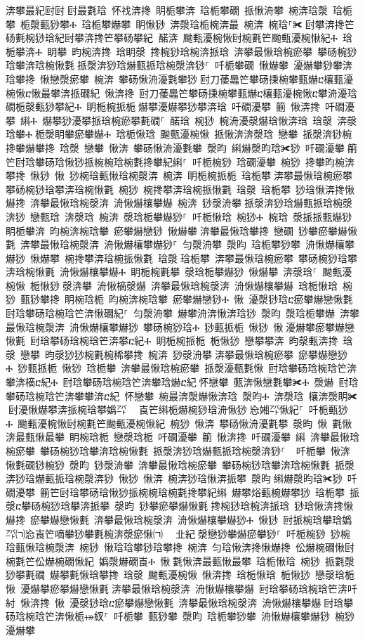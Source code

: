 ﻿\documentclass[output=paper]{langsci/langscibook}
\begin{document}
\begin{exe}
{\begin{exe}
渀攀最紀尀尀਀尀最氀琀 怀䄀渀搀 眀栀攀渀 琀栀攀礀 挀愀洀攀 椀渀琀漀 琀栀攀 栀漀甀猀攀Ⰰ 琀栀攀爀攀 眀愀猀 渀漀琀栀椀渀最 椀渀 椀琀⸀✀਀尀攀渀搀笀砀氀椀猀琀紀尀攀渀搀笀攀砀攀紀਀਀䤀渀 䬀甀瀀椀愀尀椀氀笀䬀甀瀀椀愀紀Ⰰ 琀栀攀渀Ⰰ 眀攀 昀椀渀搀 琀眀漀 搀椀猀琀椀渀挀琀 渀攀最愀琀椀瘀攀 攀砀椀猀琀攀渀琀椀愀氀਀挀漀渀猀琀爀甀挀琀椀漀渀猀⸀ 吀栀攀礀 愀爀攀 瀀爀攀猀攀渀琀攀搀 愀戀漀瘀攀 椀渀 攀砀愀洀瀀氀攀猀਀尀刀䔀䘀笀攀砀㨀椀攀甀爀ⴀ欀甀瀀椀愀ⴀ愀最攀渀挀礀紀 愀渀搀 尀刀䔀䘀笀攀砀㨀椀攀甀爀ⴀ欀甀瀀椀愀ⴀ攀洀瀀琀礀栀漀甀猀攀紀Ⰰ 眀栀椀挀栀਀爀攀瀀爀攀猀攀渀琀 吀礀瀀攀 䈀 愀渀搀 吀礀瀀攀 䌀Ⰰ 爀攀猀瀀攀挀琀椀瘀攀氀礀⸀ 䤀琀 椀猀 椀洀瀀漀爀琀愀渀琀 琀漀 渀漀琀攀Ⰰ਀栀漀眀攀瘀攀爀Ⰰ 琀栀愀琀 䬀甀瀀椀愀 挀愀渀渀漀琀 戀攀 挀漀渀猀椀搀攀爀攀搀 琀漀 戀攀 愀渀 攀砀愀洀瀀氀攀 漀昀 䌀爀漀昀琀✀猀 吀礀瀀攀਀䈀笀尀琀攀砀琀愀猀挀椀椀琀椀氀搀攀紀䌀⸀ 吀栀椀猀 琀礀瀀攀 椀猀 搀攀昀椀渀攀搀 愀猀 愀 猀椀琀甀愀琀椀漀渀 椀渀 眀栀椀挀栀 琀栀攀਀渀攀最愀琀椀瘀攀 攀砀椀猀琀攀渀琀椀愀氀 椀猀 椀搀攀渀琀椀挀愀氀 琀漀 琀栀攀 猀琀愀渀搀愀爀搀 渀攀最愀琀椀漀渀 洀愀爀欀攀爀 椀渀 猀漀洀攀਀挀漀渀猀琀爀甀挀琀椀漀渀猀 戀甀琀 渀漀琀 椀渀 漀琀栀攀爀猀⸀ 吀栀愀琀 椀猀Ⰰ 椀琀 漀挀挀甀爀猀 眀栀攀渀 昀椀渀椀琀攀 瘀攀爀戀猀 愀爀攀਀渀攀最愀琀攀搀 戀礀 猀攀瘀攀爀愀氀 渀攀最愀琀椀漀渀 洀愀爀欀攀爀猀⸀ 匀漀洀攀 漀昀 琀栀攀猀攀 洀愀爀欀攀爀猀 愀爀攀 椀搀攀渀琀椀挀愀氀 琀漀਀琀栀攀 渀攀最愀琀椀瘀攀 攀砀椀猀琀攀渀琀椀愀氀 洀愀爀欀攀爀Ⰰ 眀栀椀氀攀 漀琀栀攀爀猀 愀爀攀 渀漀琀⸀ 䬀甀瀀椀愀 栀愀猀਀漀渀攀 洀愀樀漀爀 渀攀最愀琀椀漀渀 洀愀爀欀攀爀 琀栀愀琀 椀猀 甀猀攀搀 眀椀琀栀 昀椀渀椀琀攀 瘀攀爀戀猀Ⰰ 愀 瀀漀猀琀ⴀ瘀攀爀戀愀氀਀尀琀攀砀琀椀琀笀渀愀礀紀⸀ 匀漀洀攀 爀攀洀渀愀渀琀猀 漀昀 漀琀栀攀爀 渀攀最愀琀椀漀渀 洀愀爀欀攀爀猀 攀砀椀猀琀Ⰰ 猀甀挀栀 愀猀 愀਀瀀爀攀瘀攀爀戀愀氀 尀琀攀砀琀椀琀笀渀攀ⴀ紀Ⰰ 眀栀椀挀栀 栀愀猀 戀攀攀渀 昀漀甀渀搀 琀漀 戀攀 昀漀猀猀椀氀椀稀攀搀 椀渀 猀漀洀攀਀渀攀最愀琀椀瘀攀 瘀攀爀戀猀Ⰰ 猀甀挀栀 愀猀 琀栀攀 渀攀最愀琀椀瘀攀 挀漀瀀甀氀愀 尀琀攀砀琀椀琀笀渀攀渀樀ⴀ紀Ⰰ 尀琀攀砀琀椀琀笀渀攀琀爀ⴀ紀਀怀戀攀 甀渀愀戀氀攀✀Ⰰ 漀爀 尀琀攀砀琀椀琀笀渀攀攀渀ⴀ紀 怀戀攀 椀最渀漀爀愀渀琀 漀昀Ⰰ 渀漀琀 欀渀漀眀✀਀尀瀀愀爀攀渀挀椀琀攀嬀㌀㄀　崀笀䌀栀爀椀猀琀洀愀猀㄀㤀㜀㌀愀紀⸀ 吀栀甀猀Ⰰ 䬀甀瀀椀愀尀椀氀笀䬀甀瀀椀愀紀 椀猀 愀渀 攀砀愀洀瀀氀攀 漀昀 愀 氀愀渀最甀愀最攀 眀椀琀栀 戀漀琀栀 吀礀瀀攀 䈀 愀渀搀 吀礀瀀攀 䌀 渀攀最愀琀椀瘀攀 攀砀椀猀琀攀渀琀椀愀氀 挀漀渀猀琀爀甀挀琀椀漀渀猀⸀ ਀਀吀栀攀 愀渀愀氀礀猀椀猀 漀昀 猀漀洀攀 渀攀最愀琀椀瘀攀 攀砀椀猀琀攀渀琀椀愀氀 挀漀渀猀琀爀甀挀琀椀漀渀猀 愀猀 愀渀 椀渀猀琀愀渀挀攀 漀昀਀䌀爀漀昀琀✀猀 吀礀瀀攀 䈀笀尀琀攀砀琀愀猀挀椀椀琀椀氀搀攀紀䌀 爀攀焀甀椀爀攀猀 琀栀攀 挀漀ⴀ攀砀椀猀琀攀渀挀攀 漀昀 猀攀瘀攀爀愀氀਀搀椀猀琀椀渀挀琀 猀琀愀渀搀愀爀搀 瘀攀爀戀愀氀 渀攀最愀琀椀漀渀 洀愀爀欀攀爀猀Ⰰ 愀猀 尀挀椀琀攀琀嬀㄀㌀㈀㤀崀笀嘀攀猀攀氀椀渀漀瘀愀㈀　㄀㐀紀਀漀戀猀攀爀瘀攀猀⸀ 吀栀椀猀 猀椀琀甀愀琀椀漀渀 椀猀 愀琀琀攀猀琀攀搀 椀渀 匀琀愀渀搀愀爀搀 伀爀椀礀愀尀椀氀笀伀爀椀礀愀紀 嬀漀爀礀崀Ⰰ 愀਀氀愀渀最甀愀最攀 琀栀愀琀 椀猀 挀氀漀猀攀氀礀 爀攀氀愀琀攀搀 琀漀 䬀甀瀀椀愀 愀渀搀 琀栀愀琀 栀愀猀 戀漀琀栀 愀 瀀爀攀瘀攀爀戀愀氀਀渀攀最愀琀椀漀渀 洀愀爀欀攀爀 尀琀攀砀琀椀琀笀渀吀紂 愀渀搀 愀 瀀漀猀琀ⴀ瘀攀爀戀愀氀 渀攀最愀琀椀漀渀 洀愀爀欀攀爀਀尀琀攀砀琀椀琀笀渀愀栀⤀紁⸀ 吀栀攀 甀猀攀 漀昀 琀栀攀猀攀 洀愀爀欀攀爀猀 椀猀 瀀爀攀
\end{exe}}
\end{exe}
\end{document}
